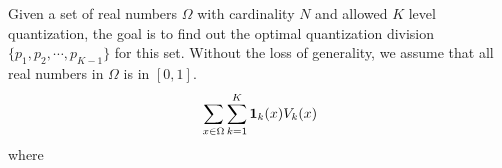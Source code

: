 Given a set of real numbers $\Omega$ with cardinality $N$ and allowed $K$ level quantization, the goal is to find out the optimal quantization division $\{p_1, p_2, \cdots, p_{K-1}\}$ for this set. Without the loss of generality, we assume that all real numbers in $\Omega$ is in $[0, 1]$.
\begin{align}
\sum_{x\in \Omega} \sum_{k=1}^K {\bf 1}_k(x)V_k(x)
\end{align}
where